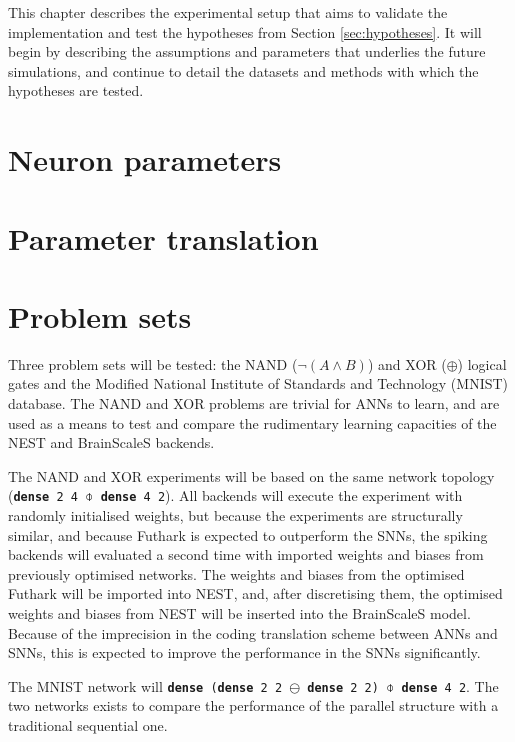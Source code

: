 \documentclass[report.tex]{subfiles}
\begin{document}
This chapter describes the experimental setup that aims to validate the
implementation and test the hypotheses
from Section \ref{sec:hypotheses}.
It will begin by describing the assumptions and parameters that underlies the
future simulations, and continue to detail the datasets and methods with which
the hypotheses are tested.

\section{Neuron parameters}


\section{Parameter translation}


\section{Problem sets}
Three problem sets will be tested: the NAND ($\neg(A \land B)$) and XOR
($\oplus$) logical gates and the 
Modified National Institute of Standards and Technology
(MNIST) database.
The NAND and XOR problems are trivial for \glspl{ANN} to learn, and are used as
a means to test and compare the rudimentary learning capacities of the NEST and
BrainScaleS backends.

The NAND and XOR experiments will be based on the same network topology
(\texttt{\textbf{dense} 2 4 $\obar$ \textbf{dense} 4 2}). 
All backends will execute the experiment with randomly initialised weights, but
because the experiments are structurally similar, and because Futhark is
expected to outperform the \glspl{SNN}, the spiking backends will evaluated
a second time with imported weights and biases from previously optimised networks.
The weights and biases from the optimised Futhark will be imported into NEST,
and, after discretising them, the optimised weights and biases from NEST will be
inserted into the BrainScaleS model.
Because of the imprecision in the coding translation scheme between \glspl{ANN} and
\glspl{SNN}, this is expected to improve the performance in the \glspl{SNN} significantly.

The MNIST network will 
\texttt{\textbf{dense} (\textbf{dense} 2 2 $\ominus$ \textbf{dense} 2 2) $\obar$ \textbf{dense} 4 2}.
The two networks exists to compare the performance of the parallel structure with 
a traditional sequential one.
\end{document}
